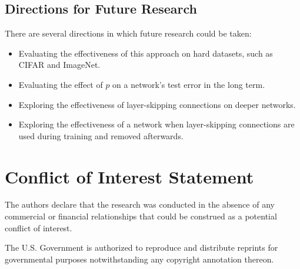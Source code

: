 \documentclass[utf8]{frontiersSCNS}
\begin{document}
\subsection{Directions for Future Research}

There are several directions in which future research could be taken:
\begin{itemize} 
\item Evaluating the effectiveness of this approach on hard datasets, such as CIFAR and ImageNet.
\item Evaluating the effect of $p$ on a network's test error in the long term.
\item Exploring the effectiveness of layer-skipping connections on deeper networks.
\item Exploring the effectiveness of a network when layer-skipping connections are used during training and removed afterwards.
\end{itemize}

\section*{Conflict of Interest Statement}

The authors declare that the research was conducted in the absence of any commercial or financial relationships that could be construed as a potential conflict of interest.

The U.S. Government is authorized to reproduce and distribute reprints for governmental purposes notwithstanding any copyright annotation thereon.
%
%
%
%

\end{document}
